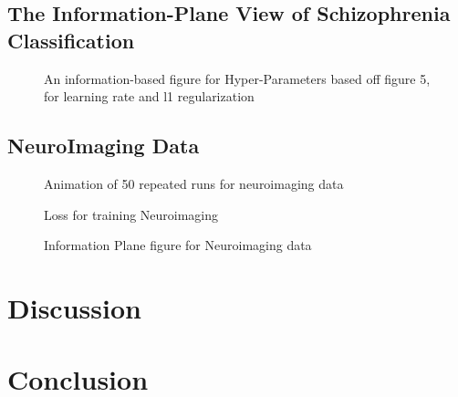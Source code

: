 \documentclass[conference, 5pt]{IEEEtran}
\begin{document}
\begin{figure}
\begin{subfigure}{0.32\linewidth}
\end{subfigure}
\end{figure}

\subsection{The Information-Plane View of Schizophrenia Classification}


\begin{figure}
\caption{An information-based figure for Hyper-Parameters based off figure 5, for learning rate and l1 regularization}
\end{figure}

\subsection{NeuroImaging Data}

\begin{figure}
\caption{Animation of 50 repeated runs for neuroimaging data}
\end{figure}

\begin{figure}
\caption{Loss for training Neuroimaging}
\end{figure}

\begin{figure}
\caption{Information Plane figure for Neuroimaging data}
\end{figure}

\section{Discussion}


\section{Conclusion}

\cite{shwartz2017opening}





\end{document}
